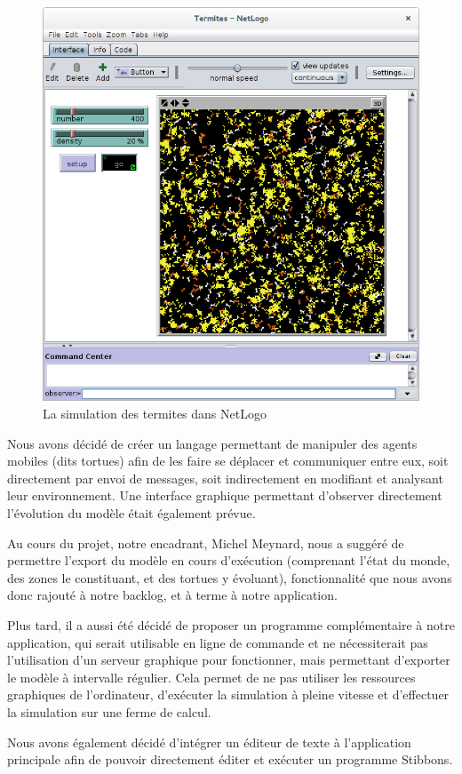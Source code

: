 \begin{figure}[h]
\centering
\includegraphics[scale=0.3]{doc/gestionProjet/netlogo-termites.png}
\caption{\label{netlogo-termites} La simulation des termites dans NetLogo}
\end{figure}

Nous avons décidé de créer un langage permettant de manipuler des agents mobiles (dits tortues) afin de les faire se déplacer et communiquer entre eux, soit directement par envoi de messages, soit indirectement en modifiant et analysant leur environnement. Une interface graphique permettant d'observer directement l'évolution du modèle était également prévue.

Au cours du projet, notre encadrant, Michel Meynard, nous a suggéré de permettre l'export du modèle en cours d'exécution (comprenant l'état du monde, des zones le constituant, et des tortues y évoluant), fonctionnalité que nous avons donc rajouté à notre backlog, et à terme à notre application.

Plus tard, il a aussi été décidé de proposer un programme complémentaire à notre application, qui serait utilisable en ligne de commande et ne nécessiterait pas l'utilisation d'un serveur graphique pour fonctionner, mais permettant d'exporter le modèle à intervalle régulier.
Cela permet de ne pas utiliser les ressources graphiques de l'ordinateur, d'exécuter la simulation à pleine vitesse et d'effectuer la simulation sur une ferme de calcul.

Nous avons également décidé d'intégrer un éditeur de texte à l'application principale afin de pouvoir directement éditer et exécuter un programme Stibbons.
